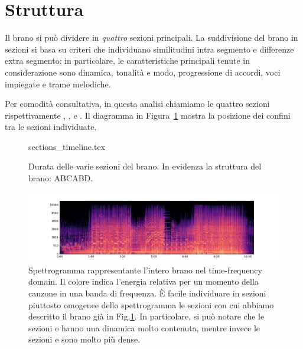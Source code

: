 \documentclass[class=book, crop=false, oneside, 12pt]{standalone}
\begin{document}
    \section{Struttura}
    \label{sec:04-struttura}

    Il brano si può dividere in \emph{quattro} sezioni principali.
    La suddivisione del brano in sezioni si basa su criteri che individuano similitudini intra segmento e differenze extra segmento; in particolare, le caratteristiche principali tenute in considerazione sono dinamica, tonalità e modo, progressione di accordi, voci impiegate e trame melodiche.

    Per comodità consultativa, in questa analisi chiamiamo le quattro sezioni rispettivamente , ,  e . Il diagramma in Figura~\ref{fig:04-sections-timeline} mostra la posizione dei confini tra le sezioni individuate.

    \begin{figure}[htb]
        \centering
        {sections_timeline.tex}
        \caption[Durata delle varie sezioni del brano.]{Durata delle varie sezioni del brano. In evidenza la struttura del brano: ABCABD.}
        \label{fig:04-sections-timeline}
    \end{figure}

    \begin{figure}[htb]
        \centering
        \includegraphics[width=\textwidth]{sheep_spectrogram.png}
        \caption[Spettrogramma rappresentante l'intero brano nel time-frequency domain.]{Spettrogramma rappresentante l'intero brano nel time-frequency domain. Il colore indica l'energia relativa per un momento della canzone in una banda di frequenza. È facile individuare in sezioni piuttosto omogenee dello spettrogramma le sezioni con cui abbiamo descritto il brano già in Fig.\ref{fig:04-sections-timeline}. In particolare, si può notare che  le sezioni  e  hanno una dinamica molto contenuta, mentre invece le sezioni  e  sono molto più dense.}
        \label{fig:sheep-spectrogram}
    \end{figure}
\end{document}
